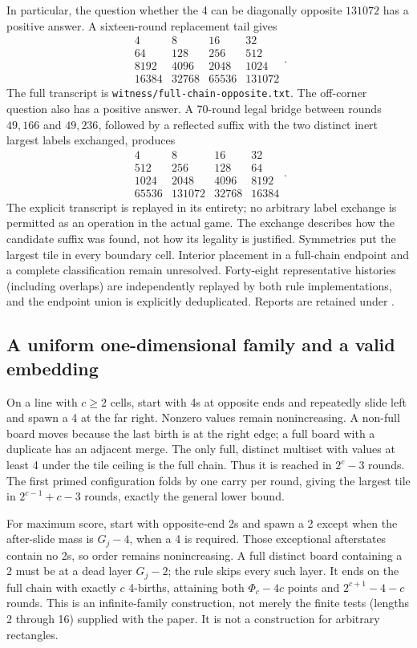 In particular, the question whether the 4 can be diagonally opposite
$131072$ has a positive answer. A sixteen-round replacement tail gives
\[
\begin{array}{rrrr}
4&8&16&32\\
64&128&256&512\\
8192&4096&2048&1024\\
16384&32768&65536&131072
\end{array}.
\]
The full transcript is \texttt{witness/full-chain-opposite.txt}.
The off-corner question also has a positive answer. A 70-round legal
bridge between rounds $49{,}166$ and $49{,}236$, followed by a reflected
suffix with the two distinct inert largest labels exchanged, produces
\[
\begin{array}{rrrr}
4&8&16&32\\
512&256&128&64\\
1024&2048&4096&8192\\
65536&131072&32768&16384
\end{array}.
\]
The explicit transcript  is
replayed in its entirety; no arbitrary label exchange is permitted as
an operation in the actual game. The exchange describes how the
candidate suffix was found, not how its legality is justified.
Symmetries put the largest tile in every boundary cell. Interior
placement in a full-chain endpoint and a complete classification remain
unresolved. Forty-eight representative histories (including overlaps)
are independently replayed by both rule implementations, and the
endpoint union is explicitly deduplicated. Reports are retained under
.

\subsection{A uniform one-dimensional family and a valid embedding}

On a line with $c\ge2$ cells, start with 4s at opposite ends and
repeatedly slide left and spawn a 4 at the far right. Nonzero values
remain nonincreasing. A non-full board moves because the last birth is
at the right edge; a full board with a duplicate has an adjacent merge.
The only full, distinct multiset with values at least 4 under the tile
ceiling is the full chain. Thus it is reached in $2^c-3$ rounds.
The first primed configuration folds by one carry per round, giving the
largest tile in $2^{c-1}+c-3$ rounds, exactly the general lower bound.

For maximum score, start with opposite-end 2s and spawn a 2 except
when the after-slide mass is $G_j-4$, when a 4 is required. Those
exceptional afterstates contain no 2s, so order remains nonincreasing.
A full distinct board containing a 2 must be at a dead layer $G_j-2$;
the rule skips every such layer. It ends on the full chain with exactly
$c$ 4-births, attaining both $\Phi_c-4c$ points and
$2^{c+1}-4-c$ rounds. This is an infinite-family construction, not merely
the finite tests (lengths 2 through 16) supplied with the paper.
It is not a construction for arbitrary rectangles.

